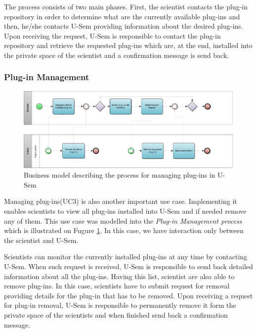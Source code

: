 The process consists of two main phases. First, the scientist contacts the plug-in repository in order to determine what are the currently available plug-ins and then, he/she contacts U-Sem providing information about the desired plug-ins. Upon receiving the request, U-Sem is responsible to contact the plug-in repository and retrieve the requested plug-ins which are, at the end, installed into the private space of the scientist and a confirmation message is send back.

\subsubsection{Plug-in Management}

\begin{figure}[h!]
  \centering
  	\includegraphics[scale=0.7,angle=270]{plug-in/business_processes/PluginManagementBusinessModel.jpg}
  \caption{Business model describing the process for managing plug-ins in U-Sem}
  \label{fig_admin_bpm}
\end{figure}

Managing plug-ins(UC3) is also another important use case. Implementing it enables scientists to view all plug-ins installed into U-Sem and if needed remove any of them. This use case was modelled into the \textit{Plug-in Management process} which is illustrated on Fugure \ref{fig_admin_bpm}. In this case, we have interaction only between the scientist and U-Sem.

Scientists can monitor the currently installed plug-ins at any time by contacting U-Sem. When such request is received, U-Sem is responsible to send back detailed information about all the plug-ins. Having this list, scientist are also able to remove plug-ins. In this case, scientists have to submit request for removal providing details for the plug-in that has to be removed. Upon receiving a request for plug-in removal, U-Sem is responsible to permanently remove it form the private space of the scientists and when finished send back a confirmation message.


